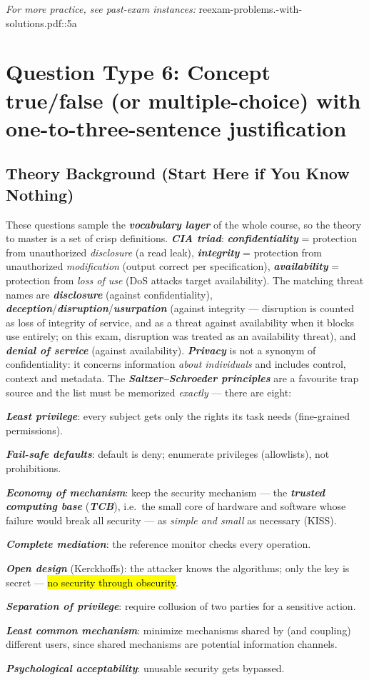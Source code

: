 \documentclass[12pt, a4paper]{article}
\newcommand{\term}[1]{\textbf{\textit{#1}}}        %
\newcommand{\imp}[1]{\hl{#1}}                       %
\begin{document}
\textit{For more practice, see past-exam instances:} reexam-problems.-with-solutions.pdf::5a

\section{Question Type 6: Concept true/false (or multiple-choice) with one-to-three-sentence justification}

\subsection*{Theory Background (Start Here if You Know Nothing)}
These questions sample the \term{vocabulary layer} of the whole course, so the theory to master is a set of crisp definitions. \term{CIA triad}: \term{confidentiality} = protection from unauthorized \emph{disclosure} (a read leak), \term{integrity} = protection from unauthorized \emph{modification} (output correct per specification), \term{availability} = protection from \emph{loss of use} (DoS attacks target availability). The matching threat names are \term{disclosure} (against confidentiality), \term{deception}/\term{disruption}/\term{usurpation} (against integrity --- disruption is counted as loss of integrity of service, and as a threat against availability when it blocks use entirely; on this exam, disruption was treated as an availability threat), and \term{denial of service} (against availability). \term{Privacy} is not a synonym of confidentiality: it concerns information \emph{about individuals} and includes control, context and metadata. The \term{Saltzer--Schroeder principles} are a favourite trap source and the list must be memorized \emph{exactly} --- there are eight:
\begin{tightitem}
\item \term{Least privilege}: every subject gets only the rights its task needs (fine-grained permissions).
\item \term{Fail-safe defaults}: default is deny; enumerate privileges (allowlists), not prohibitions.
\item \term{Economy of mechanism}: keep the security mechanism --- the \term{trusted computing base} (\term{TCB}), i.e.\ the small core of hardware and software whose failure would break all security --- as \emph{simple and small} as necessary (KISS).
\item \term{Complete mediation}: the reference monitor checks every operation.
\item \term{Open design} (Kerckhoffs): the attacker knows the algorithms; only the key is secret --- \imp{no security through obscurity}.
\item \term{Separation of privilege}: require collusion of two parties for a sensitive action.
\item \term{Least common mechanism}: minimize mechanisms shared by (and coupling) different users, since shared mechanisms are potential information channels.
\item \term{Psychological acceptability}: unusable security gets bypassed.
\end{tightitem}
\end{document}
